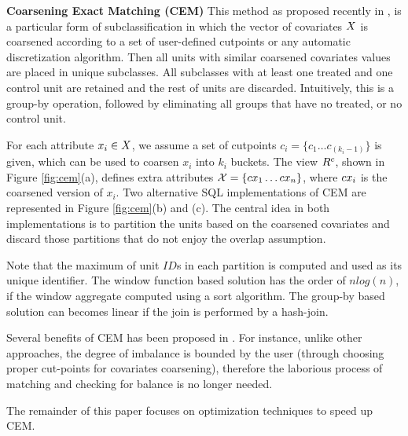 
{\bf Coarsening Exact Matching (CEM)} This method as proposed
recently in \cite{IacKinPor09},  is a particular form of subclassification in which the vector of covariates ${{X}}$ is
coarsened according to a set of user-defined cutpoints or any
automatic discretization algorithm.  Then all units with similar
coarsened covariates values are placed in unique subclasses. All
subclasses with at least one treated and one control unit are retained
and the rest of units are discarded.  Intuitively, this is a group-by
operation, followed by eliminating all groups that have no treated, or
no control unit. 

For each attribute $x_i \in {{X}}$, we assume a set of cutpoints
$c_i=\{c_{1} \ldots c_{(k_i-1)}\}$ is given, which can be used to
coarsen $x_i$ into $k_i$ buckets. The view ${{R}^c}$, shown in Figure
\ref{fig:cem}(a), defines extra attributes
${{\mathcal{X}}}=\{{{{cx}}}_1 \ldots {{{cx}}}_n\}$, where ${{{cx}}}_i$ is the coarsened
version of $x_i$. Two alternative SQL implementations of CEM are
represented in Figure \ref{fig:cem}(b) and (c).  The central idea in
both implementations is to partition the units based on the coarsened
covariates and discard those partitions that do not enjoy the overlap assumption. 
 Note that the maximum of unit
$ID$s in each partition is computed and used as its unique
identifier. The window function based solution has the order of
$nlog(n)$, if the window aggregate computed using a sort
algorithm. The group-by based solution can becomes linear if the join
is performed by a hash-join.


Several benefits of CEM has been proposed in \cite{IacKinPor09}. For
instance, unlike other approaches, the degree of imbalance is bounded
by the user (through choosing proper cut-points for covariates
coarsening), therefore the laborious process of matching and checking
for balance is no longer needed.   The remainder of this paper focuses on
optimization techniques to speed up CEM.


\vspace{-2mm} 